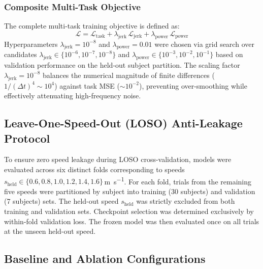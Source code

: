 \documentclass[fleqn,10pt]{wlscirep}
\newcommand{\lamjerk}{\lambda_{\mathrm{jerk}}}
\newcommand{\lampower}{\lambda_{\mathrm{power}}}
\begin{document}
\subsubsection{Composite Multi-Task Objective}
The complete multi-task training objective is defined as:
\begin{equation}
\mathcal{L} = \mathcal{L}_{\mathrm{task}} + \lamjerk \, \mathcal{L}_{\mathrm{jerk}} + \lampower \, \mathcal{L}_{\mathrm{power}}
\label{eq:loss_total}
\end{equation}
Hyperparameters $\lamjerk = 10^{-8}$ and $\lampower = 0.01$ were chosen via grid search over candidates $\lambda_{\mathrm{jerk}} \in \{10^{-6}, 10^{-7}, 10^{-8}\}$ and $\lambda_{\mathrm{power}} \in \{10^{-3}, 10^{-2}, 10^{-1}\}$ based on validation performance on the held-out subject partition. The scaling factor $\lamjerk = 10^{-8}$ balances the numerical magnitude of finite differences ($1/(\Delta t)^4 \sim 10^4$) against task MSE ($\sim 10^{-2}$), preventing over-smoothing while effectively attenuating high-frequency noise.

\subsection{Leave-One-Speed-Out (LOSO) Anti-Leakage Protocol}

To ensure zero speed leakage during LOSO cross-validation, models were evaluated across six distinct folds corresponding to speeds $s_{\mathrm{held}} \in \{0.6, 0.8, 1.0, 1.2, 1.4, 1.6\}$\,\si{\metre\per\second}. For each fold, trials from the remaining five speeds were partitioned by subject into training (30 subjects) and validation (7 subjects) sets. The held-out speed $s_{\mathrm{held}}$ was strictly excluded from both training and validation sets. Checkpoint selection was determined exclusively by within-fold validation loss. The frozen model was then evaluated once on all trials at the unseen held-out speed.

\subsection{Baseline and Ablation Configurations}
\end{document}

